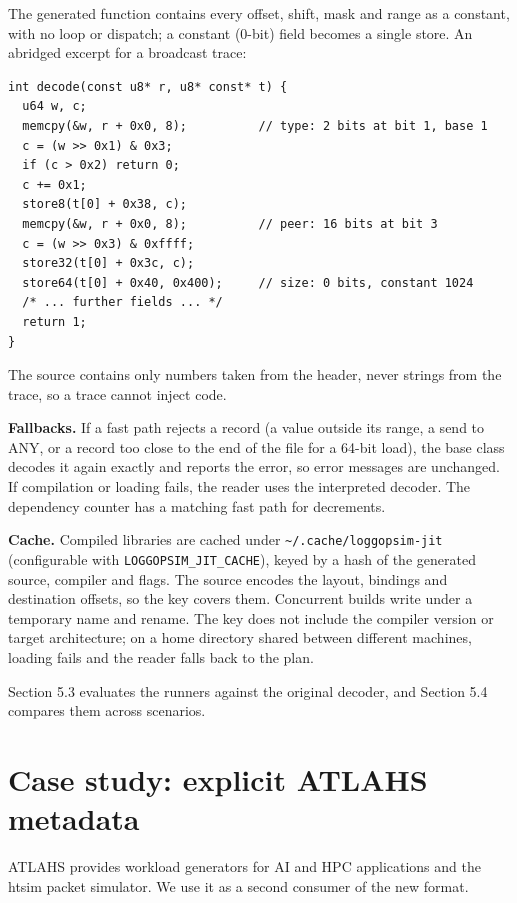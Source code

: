 \documentclass[10pt,a4paper]{article}
\begin{document}
The generated function contains every offset, shift, mask and range as a constant, with no loop or dispatch; a constant (0-bit) field becomes a single store. An abridged excerpt for a broadcast trace:

\begin{lstlisting}
int decode(const u8* r, u8* const* t) {
  u64 w, c;
  memcpy(&w, r + 0x0, 8);          // type: 2 bits at bit 1, base 1
  c = (w >> 0x1) & 0x3;
  if (c > 0x2) return 0;
  c += 0x1;
  store8(t[0] + 0x38, c);
  memcpy(&w, r + 0x0, 8);          // peer: 16 bits at bit 3
  c = (w >> 0x3) & 0xffff;
  store32(t[0] + 0x3c, c);
  store64(t[0] + 0x40, 0x400);     // size: 0 bits, constant 1024
  /* ... further fields ... */
  return 1;
}
\end{lstlisting}

The source contains only numbers taken from the header, never strings from the trace, so a trace cannot inject code.

\textbf{Fallbacks.} If a fast path rejects a record (a value outside its range, a send to ANY, or a record too close to the end of the file for a 64-bit load), the base class decodes it again exactly and reports the error, so error messages are unchanged. If compilation or loading fails, the reader uses the interpreted decoder. The dependency counter has a matching fast path for decrements.

\textbf{Cache.} Compiled libraries are cached under \texttt{\textasciitilde{}/.\allowbreak{}cache/\allowbreak{}loggopsim-\allowbreak{}jit} (configurable with \texttt{LOGGOPSIM\_\allowbreak{}JIT\_\allowbreak{}CACHE}), keyed by a hash of the generated source, compiler and flags. The source encodes the layout, bindings and destination offsets, so the key covers them. Concurrent builds write under a temporary name and rename. The key does not include the compiler version or target architecture; on a home directory shared between different machines, loading fails and the reader falls back to the plan.

Section 5.3 evaluates the runners against the original decoder, and Section 5.4 compares them across scenarios.

\hypertarget{case-study-explicit-atlahs-metadata}{}
\section{Case study: explicit ATLAHS metadata}

ATLAHS provides workload generators for AI and HPC applications and the htsim packet simulator. We use it as a second consumer of the new format.
\end{document}
